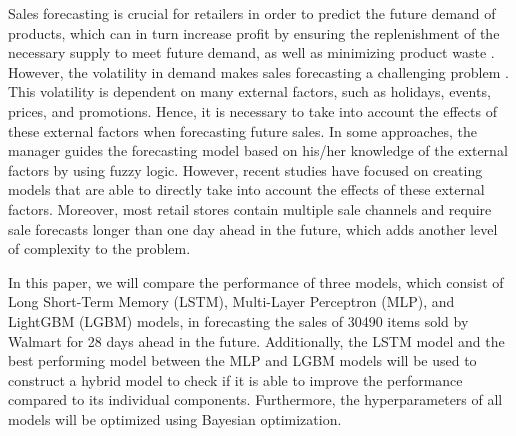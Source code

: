Sales forecasting is crucial for retailers in order to predict the future demand of products, which can in turn increase profit by ensuring the replenishment of the necessary supply to meet future demand, as well as minimizing product waste \cite{c13}.
However, the volatility in demand makes sales forecasting a challenging problem \cite{c14}.
This volatility is dependent on many external factors, such as holidays, events, prices, and promotions.
Hence, it is necessary to take into account the effects of these external factors when forecasting future sales.
In some approaches, the manager guides the forecasting model based on his/her knowledge of the external factors by using fuzzy logic.
However, recent studies have focused on creating models that are able to directly take into account the effects of these external factors.
Moreover, most retail stores contain multiple sale channels and require sale forecasts longer than one day ahead in the future, which adds another level of complexity to the problem.

In this paper, we will compare the performance of three models, which consist of Long Short-Term Memory (LSTM), Multi-Layer Perceptron (MLP), and LightGBM (LGBM) models, in forecasting the sales of 30490 items sold by Walmart for 28 days ahead in the future.
Additionally, the LSTM model and the best performing model between the MLP and LGBM models will be used to construct a hybrid model to check if it is able to improve the performance compared to its individual components.
Furthermore, the hyperparameters of all models will be optimized using Bayesian optimization.